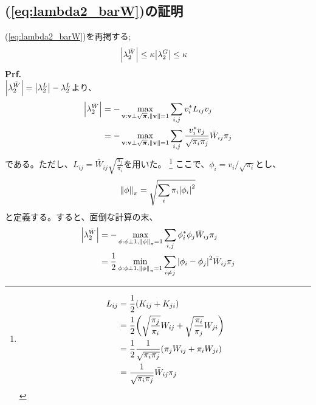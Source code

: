 \documentclass[a4paper,11pt]{jsarticle}
\numberwithin{equation}{section}
\begin{document}
\subsection{(\ref{eq:lambda2_barW})の証明}
(\ref{eq:lambda2_barW})を再掲する;
\begin{align}
    \abs{\lambda_2^{\bar{W}}} &\leq \kappa \abs{\lambda_2^{G} } \leq \kappa \nonumber
\end{align}
\textbf{Prf.}\\
$\abs{\lambda_2^{\bar{W}}} = \abs{\lambda_2^{L}} - \lambda_2^{L}$より、
\begin{align}
    \abs{\lambda_2^{\bar{W}}} 
    &= -\max_{\vb{v}:\vb{v} \perp \sqrt{\bm{\pi}}, \norm{\vb{v}}=1} \sum_{i,j} v^*_i L_{ij} v_j\\
    &= -\max_{\vb{v}:\vb{v} \perp \sqrt{\bm{\pi}}, \norm{\vb{v}}=1} \sum_{i,j} \frac{v_i^* v_j}{\sqrt{\pi_i \pi_j}} \bar{W}_{ij} \pi_j
\end{align}
である。ただし、$L_{ij} = \bar{W}_{ij} \sqrt{\frac{\pi_j}{\pi_i}}$を用いた。
\footnote{
    \begin{align}
        L_{ij} &= \frac{1}{2} (K_{ij} + K_{ji})\\
        &= \frac{1}{2} \qty(\sqrt{\frac{\pi_j}{\pi_i}} W_{ij} + \sqrt{\frac{\pi_i}{\pi_j}} W_{ji})\\
        &= \frac{1}{2} \frac{1}{\sqrt{\pi_i \pi_j}} (\pi_j W_{ij} + \pi_i W_{ji})\\
        &= \frac{1}{\sqrt{\pi_i \pi_j}} \bar{W}_{ij} \pi_j
    \end{align}
}
ここで、$\phi_i = v_i/ \sqrt{\pi_i}$とし、
\begin{align}
    \norm{\phi}_{\pi} = \sqrt{\sum_i \pi_i \abs{\phi_i}^2}
\end{align}
と定義する。すると、面倒な計算の末、
\begin{align}
    \abs{\lambda_2^{\bar{W}}}
    &= -\max_{\phi:\phi \perp 1, \norm{\phi}_{\pi}=1} \sum_{i,j} \phi_i^* \phi_j\bar{W}_{ij} \pi_j \\
    &= \frac{1}{2} \min_{\phi:\phi \perp 1, \norm{\phi}_{\pi}=1} \sum_{i\neq j} \abs{\phi_i - \phi_j}^2 \bar{W}_{ij} \pi_j
\end{align}
\end{document}
